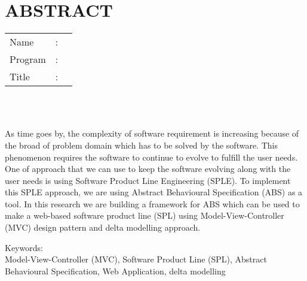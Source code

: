 %
%
%

\chapter*{ABSTRACT}

\vspace*{0.2cm}

\noindent \begin{tabular}{l l p{11.0cm}}
	Name&: & \penulis \\
	Program&: & \programEng \\
	Title&: & \judulInggris \\
\end{tabular} \\ 

\vspace*{0.5cm}

\noindent 
\\ As time goes by, the complexity of software requirement is increasing because of the broad of problem domain which has to be solved by the software. This phenomenon requires the software to continue to evolve to fulfill the user needs. One of approach that we can use to keep the software evolving along with the user needs is using Software Product Line Engineering (SPLE). To implement this SPLE approach, we are using Abstract Behavioural Specification (ABS) as a tool. In this research we are building a framework for ABS which can be used to make a web-based software product line (SPL) using Model-View-Controller (MVC) design pattern and delta modelling approach.

\vspace*{0.2cm}

\noindent Keywords: \\ 
\noindent Model-View-Controller (MVC), Software Product Line (SPL), Abstract Behavioural Specification, Web Application, delta modelling\\

\newpage